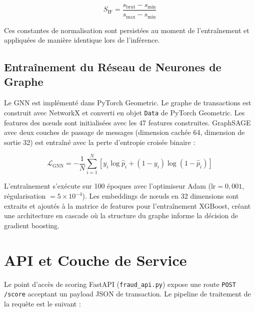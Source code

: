 \documentclass[12pt,a4paper,oneside]{book}
\theoremstyle{definition}
\theoremstyle{plain}
\begin{document}
\begin{equation}
  S_\text{IF} = \frac{s_\text{brut} - s_\text{min}}{s_\text{max} - s_\text{min}}
  \label{eq:ifscore}
\end{equation}

Ces constantes de normalisation sont persistées au moment de l'entraînement et appliquées de manière identique lors de l'inférence.

\subsection{Entraînement du Réseau de Neurones de Graphe}

Le GNN est implémenté dans PyTorch Geometric. Le graphe de transactions est construit avec NetworkX et converti en objet \texttt{Data} de PyTorch Geometric. Les features des nœuds sont initialisées avec les 47 features construites. GraphSAGE avec deux couches de passage de messages (dimension cachée 64, dimension de sortie 32) est entraîné avec la perte d'entropie croisée binaire :

\begin{equation}
  \mathcal{L}_\text{GNN} = -\frac{1}{N}\sum_{i=1}^{N}\left[
    y_i \log \hat{p}_i + (1-y_i)\log(1 - \hat{p}_i)
  \right]
  \label{eq:bceloss}
\end{equation}

L'entraînement s'exécute sur 100 époques avec l'optimiseur Adam ($\text{lr} = 0,001$, régularisation $= 5\times10^{-4}$). Les embeddings de nœuds en 32 dimensions sont extraits et ajoutés à la matrice de features pour l'entraînement XGBoost, créant une architecture en cascade où la structure du graphe informe la décision de gradient boosting.

\section{API et Couche de Service}

Le point d'accès de scoring FastAPI (\texttt{fraud\_api.py}) expose une route \texttt{POST /score} acceptant un payload JSON de transaction. Le pipeline de traitement de la requête est le suivant :
\end{document}
